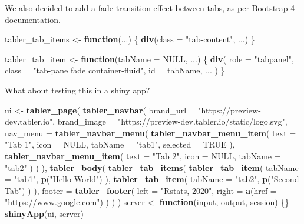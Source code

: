 \documentclass[]{book}
\newenvironment{Shaded}{\begin{snugshade}}{\end{snugshade}}
\newcommand{\ControlFlowTok}[1]{\textcolor[rgb]{0.13,0.29,0.53}{\textbf{#1}}}
\newcommand{\DataTypeTok}[1]{\textcolor[rgb]{0.13,0.29,0.53}{#1}}
\newcommand{\KeywordTok}[1]{\textcolor[rgb]{0.13,0.29,0.53}{\textbf{#1}}}
\newcommand{\NormalTok}[1]{#1}
\newcommand{\OtherTok}[1]{\textcolor[rgb]{0.56,0.35,0.01}{#1}}
\newcommand{\StringTok}[1]{\textcolor[rgb]{0.31,0.60,0.02}{#1}}
\begin{document}
We also decided to add a fade transition effect between tabs, as per Bootstrap 4 documentation.

\begin{Shaded}
\begin{Highlighting}[]
\NormalTok{tabler_tab_items <-}\StringTok{ }\ControlFlowTok{function}\NormalTok{(...) \{}
  \KeywordTok{div}\NormalTok{(}\DataTypeTok{class =} \StringTok{"tab-content"}\NormalTok{, ...)}
\NormalTok{\}}

\NormalTok{tabler_tab_item <-}\StringTok{ }\ControlFlowTok{function}\NormalTok{(}\DataTypeTok{tabName =} \OtherTok{NULL}\NormalTok{, ...) \{}
  \KeywordTok{div}\NormalTok{(}
    \DataTypeTok{role =} \StringTok{"tabpanel"}\NormalTok{,}
    \DataTypeTok{class =} \StringTok{"tab-pane fade container-fluid"}\NormalTok{,}
    \DataTypeTok{id =}\NormalTok{ tabName,}
\NormalTok{    ...}
\NormalTok{  )}
\NormalTok{\}}
\end{Highlighting}
\end{Shaded}

What about testing this in a shiny app?

\begin{Shaded}
\begin{Highlighting}[]
\NormalTok{ui <-}\StringTok{ }\KeywordTok{tabler_page}\NormalTok{(}
  \KeywordTok{tabler_navbar}\NormalTok{(}
    \DataTypeTok{brand_url =} \StringTok{"https://preview-dev.tabler.io"}\NormalTok{, }
    \DataTypeTok{brand_image =} \StringTok{"https://preview-dev.tabler.io/static/logo.svg"}\NormalTok{, }
    \DataTypeTok{nav_menu =} \KeywordTok{tabler_navbar_menu}\NormalTok{(}
      \KeywordTok{tabler_navbar_menu_item}\NormalTok{(}
        \DataTypeTok{text =} \StringTok{"Tab 1"}\NormalTok{,}
        \DataTypeTok{icon =} \OtherTok{NULL}\NormalTok{,}
        \DataTypeTok{tabName =} \StringTok{"tab1"}\NormalTok{,}
        \DataTypeTok{selected =} \OtherTok{TRUE}
\NormalTok{      ),}
      \KeywordTok{tabler_navbar_menu_item}\NormalTok{(}
        \DataTypeTok{text =} \StringTok{"Tab 2"}\NormalTok{,}
        \DataTypeTok{icon =} \OtherTok{NULL}\NormalTok{,}
        \DataTypeTok{tabName =} \StringTok{"tab2"}
\NormalTok{      )}
\NormalTok{    )}
\NormalTok{  ),}
  \KeywordTok{tabler_body}\NormalTok{(}
    \KeywordTok{tabler_tab_items}\NormalTok{(}
      \KeywordTok{tabler_tab_item}\NormalTok{(}
        \DataTypeTok{tabName =} \StringTok{"tab1"}\NormalTok{,}
        \KeywordTok{p}\NormalTok{(}\StringTok{"Hello World"}\NormalTok{)}
\NormalTok{      ),}
      \KeywordTok{tabler_tab_item}\NormalTok{(}
        \DataTypeTok{tabName =} \StringTok{"tab2"}\NormalTok{,}
        \KeywordTok{p}\NormalTok{(}\StringTok{"Second Tab"}\NormalTok{)}
\NormalTok{      )}
\NormalTok{    ),}
    \DataTypeTok{footer =} \KeywordTok{tabler_footer}\NormalTok{(}
      \DataTypeTok{left =} \StringTok{"Rstats, 2020"}\NormalTok{, }
      \DataTypeTok{right =} \KeywordTok{a}\NormalTok{(}\DataTypeTok{href =} \StringTok{"https://www.google.com"}\NormalTok{)}
\NormalTok{    )}
\NormalTok{  )}
\NormalTok{)}
\NormalTok{server <-}\StringTok{ }\ControlFlowTok{function}\NormalTok{(input, output, session) \{\}}
\KeywordTok{shinyApp}\NormalTok{(ui, server)}
\end{Highlighting}
\end{Shaded}
\end{document}
